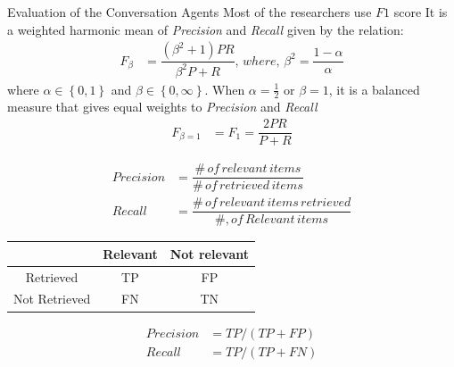 \begin{frame}{Evaluation of the Conversation Agents}
Most of the researchers use $F1$ score
It  is a weighted harmonic mean of \textit{Precision } and \textit{Recall}
given by the relation:
\begin{align}
F_\beta &= \dfrac{(\beta^2 +1)PR}{\beta^2P+R}, \, where,\, \beta^2 = \dfrac{1-\alpha}{\alpha}
\end{align}
where $\alpha \in \left\lbrace 0,1\right\rbrace$ and $\beta \in \left\lbrace 0,\infty\right\rbrace$. When $\alpha = \frac{1}{2}$ or $\beta = 1$, it is a balanced measure that gives equal weights to \textit{Precision} and \textit{Recall}
\begin{align}
F_{\beta=1} &= F_1 = \dfrac{2PR}{P+R}
\end{align}

\begin{multicols}{2}
	\begin{align}
		Precision &= \dfrac{\#\, of\, relevant\, items}{\#\, of\, retrieved\, items}\\
		Recall &= \dfrac{\#\,of\, relevant\, items\, retrieved}{\#, of\, Relevant\, items}
	\end{align}
	\vfill
	\begin{tabular}{|c|c|c|}
	\hline
	&Relevant& Not relevant\\
	\hline
	Retrieved&TP&FP\\
	\hline
	Not Retrieved&FN&TN\\
	\hline
	\end{tabular}
	\begin{align}
		Precision &= TP/(TP + FP)\\
		Recall &= TP/(TP + FN)
	\end{align}
\end{multicols}


\end{frame}

